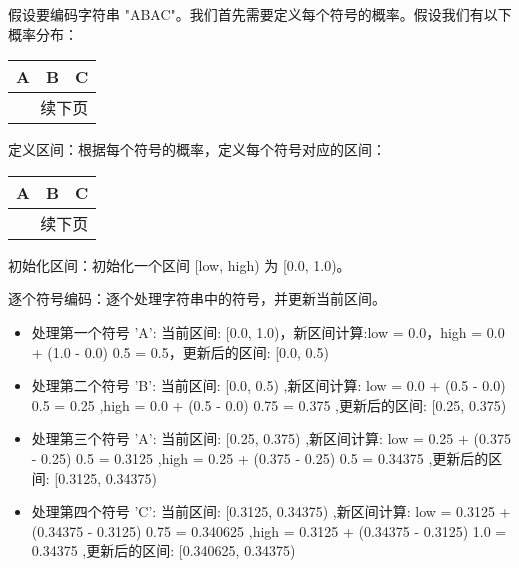 \documentclass{/home/hi/Study/template/code}
\begin{document}
\begin{tcolorbox}
	\small
	假设要编码字符串 "ABAC"。我们首先需要定义每个符号的概率。假设我们有以下概率分布：
	\begin{longtable}{ccc}
		\toprule
		\textbf{A} & \textbf{B} & \textbf{C} \\
		\midrule
		\endfirsthead
		\bottomrule()
		\multicolumn{3}{r}{续下页}
		\endfoot
		\bottomrule()
		\endlastfoot
		0.5        & 0.25       & 0.25
	\end{longtable}

	\begin{serialNumber}
		\item 定义区间：根据每个符号的概率，定义每个符号对应的区间：
		\begin{longtable}{ccc}
			\toprule
			\textbf{A} & \textbf{B}  & \textbf{C}  \\
			\midrule
			\endfirsthead
			\bottomrule()
			\multicolumn{3}{r}{续下页}
			\endfoot
			\bottomrule()
			\endlastfoot
			[0.0, 0.5) & [0.5, 0.75) & [0.75, 1.0) \\
		\end{longtable}

		\item 初始化区间：初始化一个区间 [low, high) 为 [0.0, 1.0)。
		\item 逐个符号编码：逐个处理字符串中的符号，并更新当前区间。
		\begin{equation}
			[low,high) \rightarrow  [low + (high - low)Symbol_{low} , low + ( high - low )Symbol_{high}]
		\end{equation}
		\begin{itemize}
			\item  处理第一个符号 'A': 当前区间: [0.0, 1.0)，新区间计算:low = 0.0，high = 0.0 + (1.0 - 0.0)  0.5 = 0.5，更新后的区间: [0.0, 0.5)
			\item  处理第二个符号 'B': 当前区间: [0.0, 0.5) ,新区间计算: low = 0.0 + (0.5 - 0.0)  0.5 = 0.25 ,high = 0.0 + (0.5 - 0.0)  0.75 = 0.375 ,更新后的区间: [0.25, 0.375)
			\item  处理第三个符号 'A': 当前区间: [0.25, 0.375) ,新区间计算: low = 0.25 + (0.375 - 0.25)  0.5 = 0.3125 ,high = 0.25 + (0.375 - 0.25)  0.5 = 0.34375 ,更新后的区间: [0.3125, 0.34375)
			\item  处理第四个符号 'C': 当前区间: [0.3125, 0.34375) ,新区间计算: low = 0.3125 + (0.34375 - 0.3125)  0.75 = 0.340625 ,high = 0.3125 + (0.34375 - 0.3125)  1.0 = 0.34375 ,更新后的区间: [0.340625, 0.34375)
		\end{itemize}


\end{serialNumber}
\end{tcolorbox}
\end{document}
